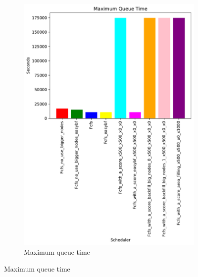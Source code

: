\documentclass[a4paper]{article}
\begin{document}
\begin{figure}[H]
\begin{subfigure}[b]{0.4\linewidth}\centering\includegraphics[width=1\linewidth]{MBSS/plot/Results_Size_And_Data_2022-01-24->2022-01-24_Maximum_queue_time_162_128_162_256_162_1024.pdf}\caption{Maximum queue time}\label{24}\end{subfigure}

\end{figure}
\end{document}
